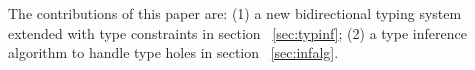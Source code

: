 

 The contributions of this paper are: (1) a new bidirectional typing system extended with type constraints in section ~\ref{sec:typinf}; (2) a type inference algorithm to handle type holes in section ~\ref{sec:infalg}.


